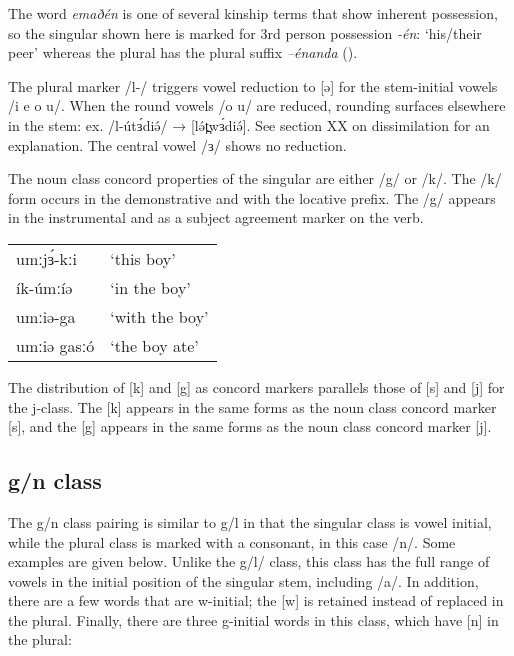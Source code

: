The word \textit{emaðén} is one of several kinship terms that show inherent possession, so the singular shown here is marked for 3rd person possession \textit{-én}: ‘his/their peer’ whereas the plural has the plural suffix \textit{–énanda} ().

The plural marker /l-/ triggers vowel reduction to [ə] for the stem-initial vowels /i e o u/. When the round vowels /o u/ are reduced, rounding surfaces elsewhere in the stem: ex. /l-útɜ́diə́/ → [lə́t̪wɜ́diə́]. See section XX on dissimilation for an explanation. The central vowel /ɜ/ shows no reduction.

The noun class concord properties of the singular are either /g/ or /k/. The /k/ form occurs in the demonstrative and with the locative prefix. The /g/ appears in the instrumental and as a subject agreement marker on the verb.  

\ea	
\begin{tabular}[t]{ll}
umːjɜ́-kːi	&	‘this boy’\\
ík-úmːíə	&	‘in the boy’\\
umːiə-ga	&	‘with the boy’\\
umːiə gasːó	&	‘the boy ate’\\
\end{tabular}
\z

The distribution of [k] and [g] as concord markers parallels those of [s] and [j] for the j-class. The [k] appears in the same forms as the noun class concord marker [s], and the [g] appears in the same forms as the noun class concord marker [j].


\subsection{g/n class}
The g/n class pairing is similar to g/l in that the singular class is vowel initial, while the plural class is marked with a consonant, in this case /n/. Some examples are given below. Unlike the g/l/ class, this class has the full range of vowels in the initial position of the singular stem, including /a/.  In addition, there are a few words that are w-initial; the [w] is retained instead of replaced in the plural. Finally, there are three g-initial words in this class, which have [n] in the plural:

